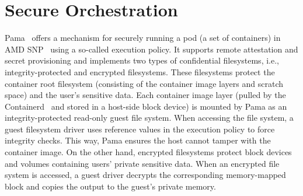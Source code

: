 \section{Secure Orchestration}
Pama~\cite*{Johnson2023ParmaCC} offers a mechanism for securely running a pod (a set of containers) in AMD SNP~\cite*{SEV_SNP_white_book} using a so-called execution policy. It supports remote attestation and secret provisioning and implements two types of confidential filesystems, i.e., integrity-protected and encrypted filesystems. These filesystems protect the container root filesystem 
(consisting of the container image layers and scratch space) and the user's sensitive data. Each container image layer (pulled by the Containerd~\cite*{containerd} and stored in a host-side block device) is mounted by Pama as an 
integrity-protected read-only guest file system. When accessing the file system, a guest filesystem driver uses reference values in the execution policy to force integrity checks. This way, Pama ensures the host cannot tamper with the container image.
On the other hand, encrypted filesystems protect block devices and volumes containing users' private sensitive data. When an encrypted file system is accessed, a guest driver decrypts the corresponding memory-mapped block and copies the output to the guest's private memory. 
